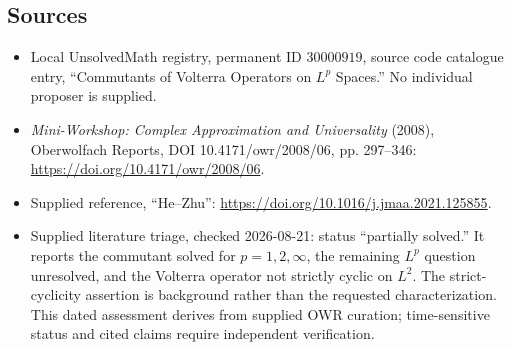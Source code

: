 \documentclass[11pt]{article}
\begin{document}
\subsection{Sources}
\begin{itemize}
\item Local UnsolvedMath registry, permanent ID \(30000919\), source code catalogue entry, ``Commutants of Volterra Operators on \(L^p\) Spaces.'' No individual proposer is supplied.
\item \emph{Mini-Workshop: Complex Approximation and Universality} (2008), Oberwolfach Reports, DOI 10.4171/owr/2008/06, pp. 297--346: \url{https://doi.org/10.4171/owr/2008/06}.
\item Supplied reference, ``He--Zhu'': \url{https://doi.org/10.1016/j.jmaa.2021.125855}.
\item Supplied literature triage, checked 2026-08-21: status ``partially solved.'' It reports the commutant solved for \(p=1,2,\infty\), the remaining \(L^p\) question unresolved, and the Volterra operator not strictly cyclic on \(L^2\). The strict-cyclicity assertion is background rather than the requested characterization. This dated assessment derives from supplied OWR curation; time-sensitive status and cited claims require independent verification.
\end{itemize}
\end{document}
